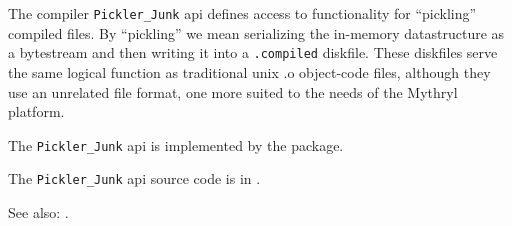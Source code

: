 
The compiler {\tt Pickler\_Junk} api defines access to functionality for ``pickling'' compiled files. 
By ``pickling'' we mean serializing the in-memory datastructure as a bytestream 
and then writing it into a {\tt .compiled} diskfile.  These diskfiles serve the same logical function 
as traditional unix {.o} object-code files, although they use an unrelated file format, one more 
suited to the needs of the Mythryl platform.

The {\tt Pickler\_Junk} api is implemented by the  package.

The {\tt Pickler\_Junk} api source code is in .

See also: .

